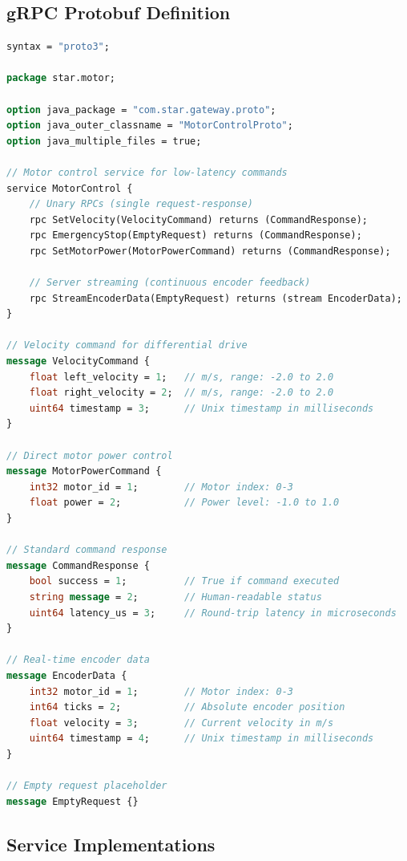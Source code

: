 \documentclass[11pt,letterpaper]{article}
\begin{document}
\subsection{gRPC Protobuf Definition}

\begin{lstlisting}[language=Protobuf, caption=motor\_control.proto]
syntax = "proto3";

package star.motor;

option java_package = "com.star.gateway.proto";
option java_outer_classname = "MotorControlProto";
option java_multiple_files = true;

// Motor control service for low-latency commands
service MotorControl {
    // Unary RPCs (single request-response)
    rpc SetVelocity(VelocityCommand) returns (CommandResponse);
    rpc EmergencyStop(EmptyRequest) returns (CommandResponse);
    rpc SetMotorPower(MotorPowerCommand) returns (CommandResponse);

    // Server streaming (continuous encoder feedback)
    rpc StreamEncoderData(EmptyRequest) returns (stream EncoderData);
}

// Velocity command for differential drive
message VelocityCommand {
    float left_velocity = 1;   // m/s, range: -2.0 to 2.0
    float right_velocity = 2;  // m/s, range: -2.0 to 2.0
    uint64 timestamp = 3;      // Unix timestamp in milliseconds
}

// Direct motor power control
message MotorPowerCommand {
    int32 motor_id = 1;        // Motor index: 0-3
    float power = 2;           // Power level: -1.0 to 1.0
}

// Standard command response
message CommandResponse {
    bool success = 1;          // True if command executed
    string message = 2;        // Human-readable status
    uint64 latency_us = 3;     // Round-trip latency in microseconds
}

// Real-time encoder data
message EncoderData {
    int32 motor_id = 1;        // Motor index: 0-3
    int64 ticks = 2;           // Absolute encoder position
    float velocity = 3;        // Current velocity in m/s
    uint64 timestamp = 4;      // Unix timestamp in milliseconds
}

// Empty request placeholder
message EmptyRequest {}
\end{lstlisting}

\subsection{Service Implementations}
\end{document}
